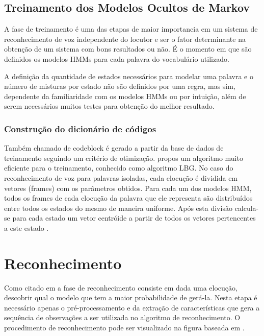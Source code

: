 \subsection{Treinamento dos Modelos Ocultos de Markov}
A fase de treinamento é uma das etapas de maior importancia em um sistema de reconhecimento de voz independente do locutor e ser o fator determinante na obtenção de um sistema com bons resultados ou não. É o momento em que são definidos os modelos HMMs para cada palavra do vocabulário utilizado.

A definição da quantidade de estados necessários para modelar uma palavra e o número de misturas por estado não são definidos por uma regra, mas sim, dependente da familiaridade com os modelos HMMs ou por intuição, além de serem necessários muitos testes para obtenção do melhor resultado. 

\subsubsection{Construção do dicionário de códigos}
Também chamado de codeblock  é gerado a partir da base de dados de treinamento seguindo um critério de otimização.  propos um algoritmo muito eficiente para o treinamento, conhecido como algoritmo LBG. No caso do reconhecimento de voz para palavras isoladas, cada elocução é dividida em vetores (frames) com os parâmetros obtidos. Para cada um dos modelos HMM, todos os frames de cada elocução da palavra que ele
representa são distribuídos entre todos os estados do mesmo de maneira uniforme. Após esta divisão calcula-se para cada estado um vetor centróide a partir de todos os vetores pertencentes a este estado \cite{RavIsolAnderson}.

\section{Reconhecimento}

Como citado em  a fase de reconhecimento consiste em dada uma elocução, descobrir qual o modelo que tem a maior probabilidade de gerá-la. Nesta etapa é necessário apenas o pré-processamento e da extração de características que gera a sequência de observações a ser utilizada no algoritmo de reconhecimento. O procedimento de
reconhecimento pode ser visualizado na figura baseada em \cite{TutorialHmmRabiner}.

